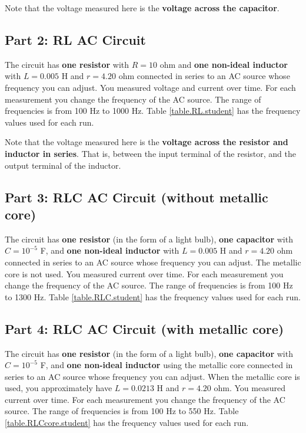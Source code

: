 Note that the voltage measured here is the \textbf{voltage across the capacitor}.
\subsection{Part 2: RL AC Circuit}
%
The circuit has \textbf{one resistor} with $R = 10 $ ohm and \textbf{one non-ideal inductor} with $L = 0.005$ H and $r = 4.20$ ohm connected in series to an AC source whose frequency you can adjust. You measured voltage and current over time. For each measurement you change the frequency of the AC source. The range of frequencies is from 100 Hz to 1000 Hz. Table \ref{table.RL.student} has the frequency values used for each run.

Note that the voltage measured here is the \textbf{voltage across the resistor and inductor in series}. That is, between the input terminal of the resistor, and the output terminal of the inductor.
\subsection{Part 3: RLC AC Circuit (without metallic core)}
%
The circuit has \textbf{one resistor} (in the form of a light bulb), \textbf{one capacitor} with $C = 10^{-5}$ F, and \textbf{one non-ideal inductor} with $L = 0.005$ H and $r = 4.20$ ohm connected in series to an AC source whose frequency you can adjust. The metallic core is not used. You measured current over time. For each measurement you change the frequency of the AC source. The range of frequencies is from 100 Hz to 1300 Hz. Table \ref{table.RLC.student} has the frequency values used for each run.
\subsection{Part 4: RLC AC Circuit (with metallic core)}
%
The circuit has \textbf{one resistor} (in the form of a light bulb), \textbf{one capacitor} with $C = 10^{-5}$ F, and \textbf{one non-ideal inductor} using the metallic core connected in series to an AC source whose frequency you can adjust. When the metallic core is used, you approximately have $L = 0.0213$ H and $r = 4.20$ ohm. You measured current over time. For each measurement you change the frequency of the AC source. The range of frequencies is from 100 Hz to 550 Hz. Table \ref{table.RLCcore.student} has the frequency values used for each run.

